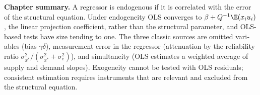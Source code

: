 \begin{english}
\textbf{Chapter summary.} A regressor is endogenous if it is correlated with the error of the structural equation. Under endogeneity OLS converges to $\beta+Q^{-1}\E(x_iu_i)$, the linear projection coefficient, rather than the structural parameter, and OLS-based tests have size tending to one. The three classic sources are omitted variables (bias $\gamma\delta$), measurement error in the regressor (attenuation by the reliability ratio $\sigma_{x^*}^2/(\sigma_{x^*}^2+\sigma_e^2)$), and simultaneity (OLS estimates a weighted average of supply and demand slopes). Exogeneity cannot be tested with OLS residuals; consistent estimation requires instruments that are relevant and excluded from the structural equation.
\end{english}
